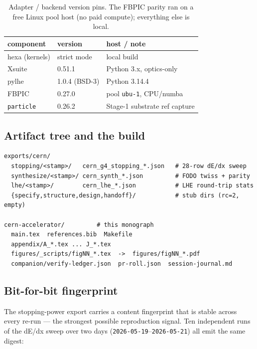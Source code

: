 \begin{table}[h]
\centering
\small
\begin{tabular}{@{}l l l@{}}
\toprule
component & version & host / note \\
\midrule
hexa (kernels)   & strict mode      & local build \\
Xsuite           & 0.51.1           & Python 3.x, optics-only \\
pylhe            & 1.0.4 (BSD-3)    & Python 3.14.4 \\
FBPIC            & 0.27.0           & pool \texttt{ubu-1}, CPU/numba \\
\texttt{particle}& 0.26.2           & Stage-1 substrate ref capture \\
\bottomrule
\end{tabular}
\caption{Adapter / backend version pins. The FBPIC parity ran on a free
Linux pool host (no paid compute); everything else is local.}
\label{tab:app-repro-env}
\end{table}

\subsection{Artifact tree and the build}
\label{app:repro-tree}

\begin{lstlisting}
exports/cern/
  stopping/<stamp>/   cern_g4_stopping_*.json   # 28-row dE/dx sweep
  synthesize/<stamp>/ cern_synth_*.json         # FODO twiss + parity
  lhe/<stamp>/        cern_lhe_*.json           # LHE round-trip stats
  {specify,structure,design,handoff}/           # stub dirs (rc=2, empty)

cern-accelerator/         # this monograph
  main.tex  references.bib  Makefile
  appendix/A_*.tex ... J_*.tex
  figures/_scripts/figNN_*.tex  ->  figures/figNN_*.pdf
  companion/verify-ledger.json  pr-roll.json  session-journal.md
\end{lstlisting}

\subsection{Bit-for-bit fingerprint}
\label{app:repro-fp}

The stopping-power export carries a content fingerprint that is stable
across every re-run --- the strongest possible reproduction signal. Ten
independent runs of the dE/dx sweep over two days
(\texttt{2026-05-19}--\texttt{2026-05-21}) all emit the same digest:

